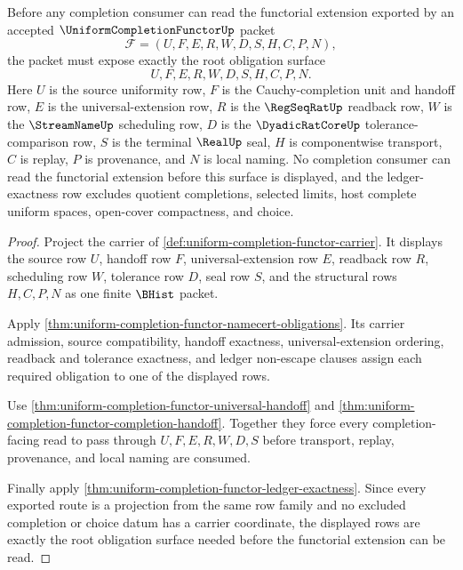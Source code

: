 \begin{theorem}
\label{thm:uniformcompletionfunctor-root-obligation-surface}
Before any completion consumer can read the functorial extension exported by an accepted $\UniformCompletionFunctorUp$ packet
$$
\mathcal{F}=(U,F,E,R,W,D,S,H,C,P,N),
$$
the packet must expose exactly the root obligation surface
$$
U,F,E,R,W,D,S,H,C,P,N .
$$
Here $U$ is the source uniformity row, $F$ is the Cauchy-completion unit and handoff row, $E$ is the universal-extension row, $R$ is the $\RegSeqRatUp$ readback row, $W$ is the $\StreamNameUp$ scheduling row, $D$ is the $\DyadicRatCoreUp$ tolerance-comparison row, $S$ is the terminal $\RealUp$ seal, $H$ is componentwise transport, $C$ is replay, $P$ is provenance, and $N$ is local naming. No completion consumer can read the functorial extension before this surface is displayed, and the ledger-exactness row excludes quotient completions, selected limits, host complete uniform spaces, open-cover compactness, and choice.
\end{theorem}
\begin{proof}
Project the carrier of \autoref{def:uniform-completion-functor-carrier}. It displays the source row $U$, handoff row $F$, universal-extension row $E$, readback row $R$, scheduling row $W$, tolerance row $D$, seal row $S$, and the structural rows $H,C,P,N$ as one finite $\BHist$ packet.

Apply \autoref{thm:uniform-completion-functor-namecert-obligations}. Its carrier admission, source compatibility, handoff exactness, universal-extension ordering, readback and tolerance exactness, and ledger non-escape clauses assign each required obligation to one of the displayed rows.

Use \autoref{thm:uniform-completion-functor-universal-handoff} and \autoref{thm:uniform-completion-functor-completion-handoff}. Together they force every completion-facing read to pass through $U,F,E,R,W,D,S$ before transport, replay, provenance, and local naming are consumed.

Finally apply \autoref{thm:uniform-completion-functor-ledger-exactness}. Since every exported route is a projection from the same row family and no excluded completion or choice datum has a carrier coordinate, the displayed rows are exactly the root obligation surface needed before the functorial extension can be read.
\end{proof}


